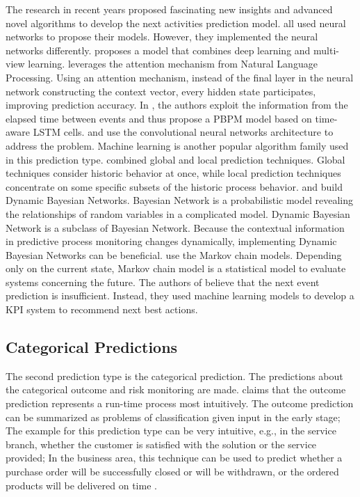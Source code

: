 \documentclass[runningheads]{llncs}
\begin{document}
		The research in recent years proposed fascinating new insights and advanced novel algorithms to develop the next activities prediction model. \cite{art-5} \cite{art-7} \cite{art-14} \cite{art-23} \cite{art-24} \cite{art-28} \cite{art-31} all used neural networks to propose their models. However, they implemented the neural networks differently. \cite{art-5} proposes a model that combines deep learning and multi-view learning. \cite{art-7} leverages the attention mechanism from Natural Language Processing. Using an attention mechanism, instead of the final layer in the neural network constructing the context vector, every hidden state participates, improving prediction accuracy. In \cite{art-14}, the authors exploit the information from the elapsed time between events and thus propose a PBPM model based on time-aware LSTM cells. \cite{art-23} and \cite{art-24} use the convolutional neural networks architecture to address the problem. Machine learning is another popular algorithm family used in this prediction type. \cite{art-1} combined global and local prediction techniques. Global techniques consider historic behavior at once, while local prediction techniques concentrate on some specific subsets of the historic process behavior. \cite{art-25} and \cite{art-30} build Dynamic Bayesian Networks. Bayesian Network is a probabilistic model revealing the relationships of random variables in a complicated model. Dynamic Bayesian Network is a subclass of Bayesian Network. Because the contextual information in predictive process monitoring changes dynamically, implementing Dynamic Bayesian Networks can be beneficial. \cite{art-10} use the Markov chain models. Depending only on the current state, Markov chain model is a statistical model to evaluate systems concerning the future. The authors of \cite{art-30} believe that the next event prediction is insufficient. Instead, they used machine learning models to develop a KPI system to recommend next best actions.
		
		\subsection{Categorical Predictions}
		The second prediction type is the categorical prediction. The predictions about the categorical outcome and risk monitoring are made. \cite{art-9} claims that the outcome prediction represents a run-time process most intuitively. The outcome prediction can be summarized as problems of classification given input in the early stage; The example for this prediction type can be very intuitive, e.g., in the service branch, whether the customer is satisfied with the solution or the service provided; In the business area, this technique can be used to predict whether a purchase order will be successfully closed or will be withdrawn, or the ordered products will be delivered on time \cite{art-12}.
	
\end{document}
